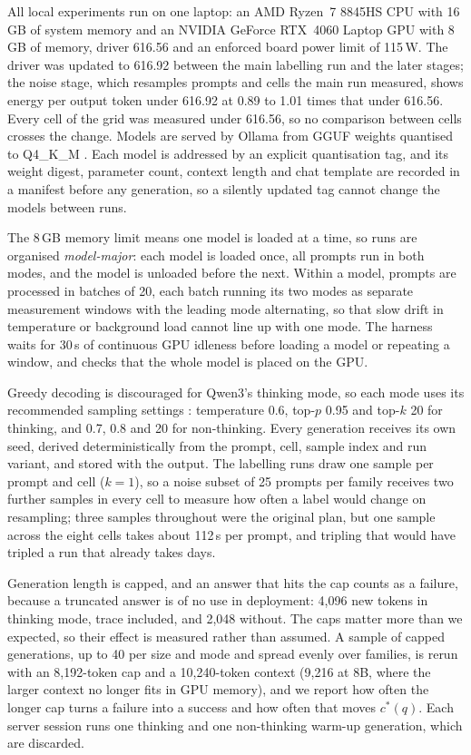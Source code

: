 \documentclass[final,5p,times,twocolumn]{elsarticle}
\theoremstyle{plain}
\newcommand{\cstar}{c^{*}}
\begin{document}
All local experiments run on one laptop: an AMD Ryzen~7 8845HS CPU with
16\,GB of system memory and an NVIDIA GeForce RTX~4060 Laptop GPU with 8\,GB
of memory, driver 616.56 and an enforced board power limit of 115\,W. The
driver was updated to 616.92 between the main labelling run and the later
stages; the noise stage, which resamples prompts and cells the main run
measured, shows energy per output token under 616.92 at 0.89 to 1.01 times
that under 616.56. Every cell of the grid was measured under 616.56, so no
comparison between cells crosses the change. Models are served by Ollama \cite{ollama} from GGUF
weights quantised to Q4\_K\_M \cite{gerganov2023llamacpp}. Each model is
addressed by an explicit quantisation tag, and its weight digest, parameter
count, context length and chat template are recorded in a manifest before any
generation, so a silently updated tag cannot change the models between runs.

The 8\,GB memory limit means one model is loaded at a time, so runs are
organised \emph{model-major}: each model is loaded once, all prompts run in
both modes, and the model is unloaded before the next. Within a model,
prompts are processed in batches of 20, each batch running its two modes as
separate measurement windows with the leading mode alternating, so that slow
drift in temperature or background load cannot line up with one mode. The
harness waits for 30\,s of continuous GPU idleness before loading a model or
repeating a window, and checks that the whole model is placed on the GPU.

Greedy decoding is discouraged for Qwen3's thinking mode, so each mode uses
its recommended sampling settings \cite{qwen2025modelcard}: temperature 0.6,
top-$p$ 0.95 and top-$k$ 20 for thinking, and 0.7, 0.8 and 20 for
non-thinking. Every generation receives its own seed, derived
deterministically from the prompt, cell, sample index and run variant, and
stored with the output. The labelling runs draw one sample per prompt and
cell ($k = 1$), so a noise subset of 25 prompts per family receives two
further samples in every cell to measure how often a label would change on
resampling; three samples throughout were the original plan, but one sample
across the eight cells takes about 112\,s per prompt, and tripling that would
have tripled a run that already takes days.

Generation length is capped, and an answer that hits the cap counts as a
failure, because a truncated answer is of no use in deployment: 4{,}096 new
tokens in thinking mode, trace included, and 2{,}048 without. The caps matter
more than we expected, so their effect is measured rather than assumed. A
sample of capped generations, up to 40 per size and mode and spread evenly
over families, is rerun with an 8{,}192-token cap and a 10{,}240-token
context (9{,}216 at 8B, where the larger context no longer fits in GPU
memory), and we report how often the longer cap turns a failure into a
success and how often that moves $\cstar(q)$. Each server session runs one
thinking and one non-thinking warm-up generation, which are discarded.
\end{document}
